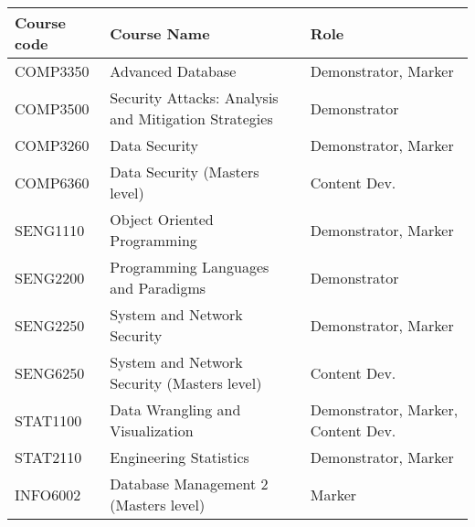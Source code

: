 \documentclass{myresume}
\begin{document}
        \begin{center}
        \begin{tabular}{ l | l | l }
                \hline
                \textbf{Course code} & \textbf{Course Name} &
                \textbf{Role} \\
                \hline
                \hline
                COMP3350 & Advanced Database & Demonstrator, Marker \\
                \hline
                COMP3500 & Security Attacks: Analysis and Mitigation Strategies & Demonstrator \\
                \hline
                COMP3260 & Data Security & Demonstrator, Marker \\
                \hline
                COMP6360 & Data Security (Masters level) & Content Dev. \\
                \hline
                SENG1110 & Object Oriented Programming & Demonstrator, Marker \\
                \hline
                SENG2200 & Programming Languages and Paradigms & Demonstrator \\
                \hline
                SENG2250 & System and Network Security & Demonstrator, Marker \\
                \hline
                SENG6250 & System and Network Security (Masters level) & Content Dev. \\
                \hline
                STAT1100 & Data Wrangling and Visualization & Demonstrator, Marker, Content Dev. \\
                \hline
                STAT2110 & Engineering Statistics & Demonstrator, Marker \\
                \hline
                INFO6002 & Database Management 2 (Masters level) & Marker \\
                \hline
        \end{tabular}
        \end{center}



    	
	\nocite{*}
	
\end{document}
